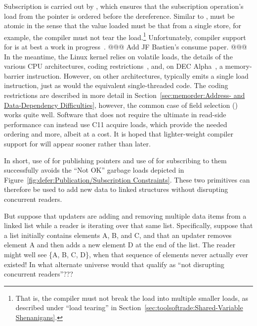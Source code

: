 Subscription is carried out by , which ensures that
the subscription operation's load from the pointer is ordered before the
dereference.
Similar to ,  must be
atomic in the sense that the value loaded must be that from a single
store, for example, the compiler must not tear the load.\footnote{
	That is, the compiler must not break the load into multiple
	smaller loads, as described under ``load tearing'' in
	Section~\ref{sec:toolsoftrade:Shared-Variable Shenanigans}.}
Unfortunately, compiler support for  is at best
a work in progress~\cite{PaulEMcKennneyConsumeP0190R4,PaulEMcKenney2017markconsumeP0462R1}. @@@ Add JF Bastien's consume paper. @@@
In the meantime, the Linux kernel relies on volatile loads, the details of
the various CPU architectures, coding
restrictions~\cite{PaulEMcKenney2014rcu-dereference},
and, on DEC Alpha~\cite{ALPHA2002}, a memory-barrier instruction.
However, on other architectures,  typically
emits a single load instruction, just as would the equivalent single-threaded
code.
The coding restrictions are described in more detail in
Section~\ref{sec:memorder:Address- and Data-Dependency Difficulties},
however, the common case of field selection (\qco{->}) works quite well.
Software that does not require the ultimate in read-side performance
can instead use C11 acquire loads, which provide the needed ordering and
more, albeit at a cost.
It is hoped that lighter-weight compiler support for 
will appear sooner rather than later.

In short, use of  for publishing pointers and
use of  for subscribing to them successfully avoids the
``Not OK'' garbage loads depicted in
Figure~\ref{fig:defer:Publication/Subscription Constraints}.
These two primitives can therefore be used to add new data to linked
structures without disrupting concurrent readers.

\QuickQuiz{}
	But suppose that updaters are adding and removing multiple data
	items from a linked list while a reader is iterating over that
	same list.
	Specifically, suppose that a list initially contains elements
	A, B, and C, and that an updater removes element A and then
	adds a new element D at the end of the list.
	The reader might well see \{A, B, C, D\}, when that sequence of
	elements never actually ever existed!
	In what alternate universe would that qualify as ``not disrupting
	concurrent readers''???
 \QuickQuizEnd

